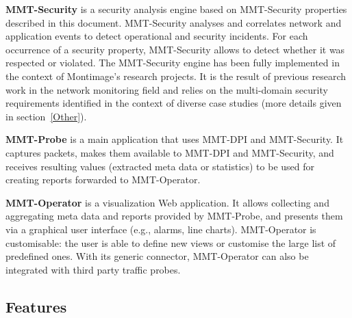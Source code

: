 \textbf{MMT-Security} is a security analysis engine based on MMT-Security properties described in this document. MMT-Security analyses and correlates network and application events to detect operational and security incidents. For each occurrence of a security property, MMT-Security allows to detect whether it was respected or violated.
The MMT-Security engine has been fully implemented in the context of Montimage{\textquoteright}s research projects. It is the result of previous research work in the network monitoring field and relies on the multi-domain security requirements identified in the context of diverse case studies (more details given in section~\ref{Other}). 

\textbf{MMT-Probe} is a main application that uses MMT-DPI and MMT-Security. It captures packets, makes them available to MMT-DPI and MMT-Security, and receives resulting values (extracted meta data or statistics) to be used for creating reports forwarded to MMT-Operator.

\textbf{MMT-Operator} is a visualization Web application. It allows collecting and aggregating meta data and reports provided by MMT-Probe, and presents them via a graphical user interface (e.g., alarms, line charts). MMT-Operator is customisable: the user is able to define new views or customise the large list of predefined ones. With its generic connector, MMT-Operator can also be integrated with third party traffic probes.




\subsection{Features}

